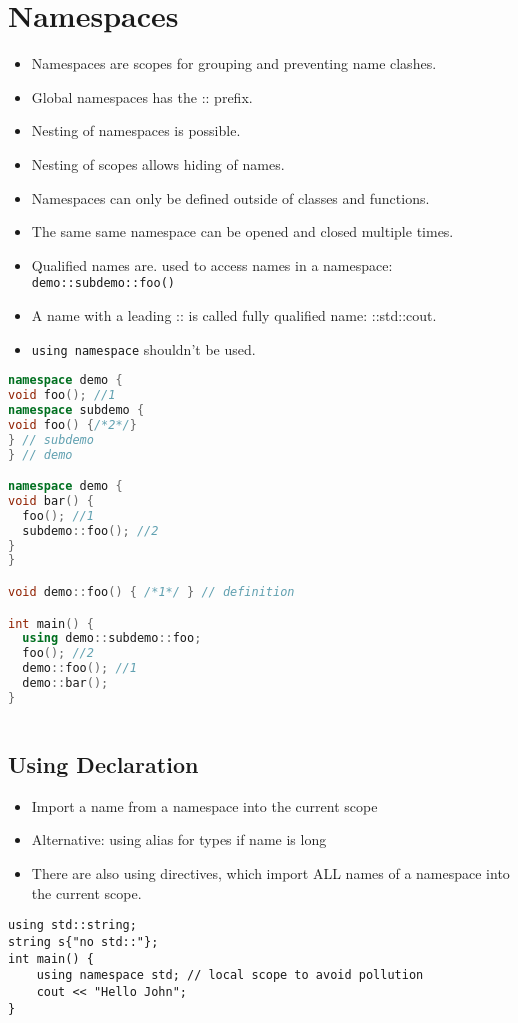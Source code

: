 \section{Namespaces}
\begin{itemize}
  \itemsep -0.5em 
  \item Namespaces are scopes for grouping and preventing name clashes.
  \item Global namespaces has the :: prefix.
  \item Nesting of namespaces is possible.
  \item Nesting of scopes allows hiding of names.
  \item Namespaces can only be defined outside of classes and functions.
  \item The same same namespace can be opened and closed multiple times.
  \item Qualified names are. used to access names in a namespace: \lstinline|demo::subdemo::foo()|
  \item A name with a leading :: is called fully qualified name: ::std::cout.
  \item \lstinline|using namespace| shouldn't be used.
\end{itemize}
\begin{lstlisting}[language=C++]
namespace demo {
void foo(); //1
namespace subdemo {
void foo() {/*2*/}
} // subdemo
} // demo

namespace demo {
void bar() {
  foo(); //1
  subdemo::foo(); //2
}
}

void demo::foo() { /*1*/ } // definition

int main() {
  using demo::subdemo::foo;
  foo(); //2
  demo::foo(); //1
  demo::bar();
}
	
\end{lstlisting}

\subsection{Using Declaration}
\begin{itemize}
  \itemsep -0.5em 
  \item Import a name from a namespace into the current scope
  \item Alternative: using alias for types if name is long
  \item There are also using directives, which import ALL names of a namespace into the current scope.
\end{itemize}
\begin{lstlisting}
using std::string; 
string s{"no std::"};
int main() {
	using namespace std; // local scope to avoid pollution
	cout << "Hello John";
}
\end{lstlisting}


